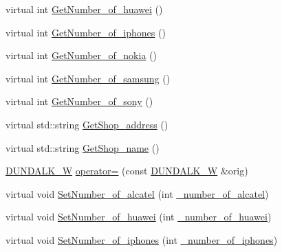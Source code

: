 \begin{DoxyCompactItemize}
\item 
virtual int \hyperlink{class_d_u_n_d_a_l_k___w_ab52fec6b8e051fc3aa064822d9c76d7e_ab52fec6b8e051fc3aa064822d9c76d7e}{Get\+Number\+\_\+of\+\_\+huawei} ()
\item 
virtual int \hyperlink{class_d_u_n_d_a_l_k___w_a8fe67b0cea3e113beaf88917768fafc9_a8fe67b0cea3e113beaf88917768fafc9}{Get\+Number\+\_\+of\+\_\+iphones} ()
\item 
virtual int \hyperlink{class_d_u_n_d_a_l_k___w_aaba4f04cd24ca7ac1d37f6d0ec76a3c7_aaba4f04cd24ca7ac1d37f6d0ec76a3c7}{Get\+Number\+\_\+of\+\_\+nokia} ()
\item 
virtual int \hyperlink{class_d_u_n_d_a_l_k___w_a619751e08d43b1915f191e1de6b53e30_a619751e08d43b1915f191e1de6b53e30}{Get\+Number\+\_\+of\+\_\+samsung} ()
\item 
virtual int \hyperlink{class_d_u_n_d_a_l_k___w_af9830770e23fa88a55fc39c5638763b8_af9830770e23fa88a55fc39c5638763b8}{Get\+Number\+\_\+of\+\_\+sony} ()
\item 
virtual std\+::string \hyperlink{class_d_u_n_d_a_l_k___w_af9c0a573ae5d8b388a46652621224002_af9c0a573ae5d8b388a46652621224002}{Get\+Shop\+\_\+address} ()
\item 
virtual std\+::string \hyperlink{class_d_u_n_d_a_l_k___w_a1b0a9008ea26cf2181eca0dfb93acc9f_a1b0a9008ea26cf2181eca0dfb93acc9f}{Get\+Shop\+\_\+name} ()
\item 
\hyperlink{class_d_u_n_d_a_l_k___w}{D\+U\+N\+D\+A\+L\+K\+\_\+W} \hyperlink{class_d_u_n_d_a_l_k___w_a63e33d9aa73d944f92928e90566874b9_a63e33d9aa73d944f92928e90566874b9}{operator=} (const \hyperlink{class_d_u_n_d_a_l_k___w}{D\+U\+N\+D\+A\+L\+K\+\_\+W} \&orig)
\item 
virtual void \hyperlink{class_d_u_n_d_a_l_k___w_a7cc39880414729ad260abb46c6b320d0_a7cc39880414729ad260abb46c6b320d0}{Set\+Number\+\_\+of\+\_\+alcatel} (int \hyperlink{class_d_u_n_d_a_l_k___w_a67a471ec2d409a309ebc179ff4d789bc_a67a471ec2d409a309ebc179ff4d789bc}{\+\_\+number\+\_\+of\+\_\+alcatel})
\item 
virtual void \hyperlink{class_d_u_n_d_a_l_k___w_ae97581138541d975b6d1f49eb1dfb5ac_ae97581138541d975b6d1f49eb1dfb5ac}{Set\+Number\+\_\+of\+\_\+huawei} (int \hyperlink{class_d_u_n_d_a_l_k___w_a84781068676dee44cb4654706d8fec51_a84781068676dee44cb4654706d8fec51}{\+\_\+number\+\_\+of\+\_\+huawei})
\item 
virtual void \hyperlink{class_d_u_n_d_a_l_k___w_a93b3677db13a4f469f8488d45a62ec74_a93b3677db13a4f469f8488d45a62ec74}{Set\+Number\+\_\+of\+\_\+iphones} (int \hyperlink{class_d_u_n_d_a_l_k___w_a82b528f661644166d93a5209524b4543_a82b528f661644166d93a5209524b4543}{\+\_\+number\+\_\+of\+\_\+iphones})

\end{DoxyCompactItemize}

